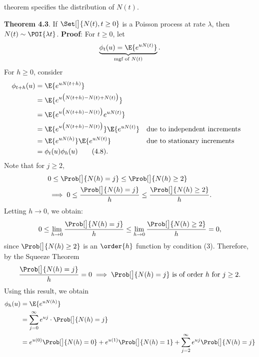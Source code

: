 theorem specifies the distribution of $ N(t) $.
\begin{Result}
    \textbf{Theorem 4.3}. If $ \Set[\big]{N(t),t\ge 0} $ is a Poisson process at rate $ \lambda $, then $ N(t) \sim \POI{\lambda t} $.
    \tcblower{}
    \textbf{Proof}: For $ t\ge 0 $, let
    \[ \underbrace{\phi_t(u)=\E{e^{u N(t)}}}_{\text{mgf of $N(t)$}}. \]
    For $ h\ge 0 $, consider
    \begin{align*}
        \phi_{t+h}(u)
         & =\E{e^{uN(t+h)}}                                                                         \\
         & =\E{e^{u\bigl(N(t+h)-N(t)+N(t)\bigr)}}                                                   \\
         & =\E{e^{u\bigl(N(t+h)-N(t)\bigr)}e^{uN(t)}}                                               \\
         & =\E{e^{u\bigl(N(t+h)-N(t)\bigr)}}\E{e^{uN(t)}} &  & \text{due to independent increments} \\
         & =\E{e^{u N(h)}}\E{e^{u N(t)}}                  &  & \text{due to stationary increments}  \\
         & =\phi_t(u)\phi_h(u)\label{eq4.8}\tag*{(4.8)}.
    \end{align*}
    Note that for $ j\ge 2 $,
    \begin{align*}
         & 0 \le \Prob[\big]{N(h)=j}\le \Prob[\big]{N(h)\ge 2}                              \\
         & \implies 0\le \frac{\Prob[\big]{N(h)=j}}{h}\le \frac{\Prob[\big]{N(h)\ge 2}}{h}.
    \end{align*}
    Letting $ h\to 0 $, we obtain:
    \[ 0\le \lim_{h\to 0}\frac{\Prob[\big]{N(h)=j}}{h}\le \lim_{h\to 0}\frac{\Prob[\big]{N(h)\ge 2}}{h}=0, \]
    since $ \Prob[\big]{N(h)\ge 2} $ is an $ \order{h} $ function by condition (3).
    Therefore, by the Squeeze Theorem
    \[ \frac{\Prob[\big]{N(h)=j}}{h}=0\implies \Prob[\big]{N(h)=j}\text{ is of order $h$ for $j\ge 2$}. \]
    Using this result, we obtain
    \begin{align*}
        \phi_h(u)
         & =\E{e^{u N(h)}}                                                                                                            \\
         & =\sum_{j=0}^{\infty}e^{u j}\cdot \Prob[\big]{N(h)=j}                                                                       \\
         & =e^{u(0)}\Prob[\big]{N(h)=0}+e^{u(1)}\Prob[\big]{N(h)=1}+
        \sum_{j=2}^{\infty}e^{uj}\Prob[\big]{N(h)=j}                                                                                  \\

\end{align*}
\end{Result}
